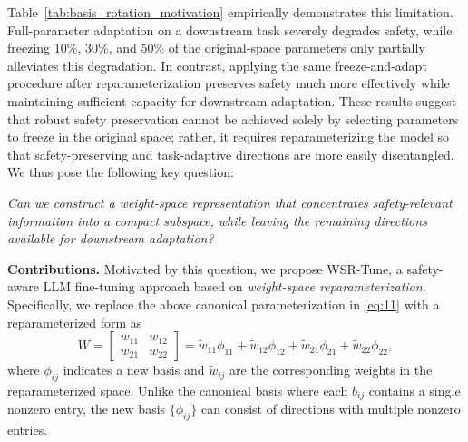 \documentclass{article}
\newcommand{\wjb}[1]{{\leavevmode\color{orange}[jb: #1]}}
\begin{document}
Table~\ref{tab:basis_rotation_motivation} empirically demonstrates this limitation. Full-parameter adaptation on a downstream task severely degrades safety, while freezing 10\%, 30\%, and 50\% of the original-space parameters only partially alleviates this degradation.
In contrast, applying the same freeze-and-adapt procedure after reparameterization preserves safety much more effectively while maintaining sufficient capacity for downstream adaptation. These results suggest that robust safety preservation cannot be achieved solely by selecting parameters to freeze in the original space; rather, it requires reparameterizing the model so that safety-preserving and task-adaptive directions are more easily disentangled.
We thus pose the following key question: 

\textit{Can we construct a weight-space representation that concentrates safety-relevant information into a compact subspace, while leaving the remaining directions available for downstream adaptation?}



\textbf{Contributions.} Motivated by this question, we propose WSR-Tune, a safety-aware LLM fine-tuning approach based on \textit{weight-space reparameterization}.  Specifically, we replace the above canonical parameterization in \eqref{eq:11} with a reparameterized form as
\begin{equation}
W = \begin{bmatrix} w_{11} & w_{12} \\ w_{21} & w_{22} \end{bmatrix} = \tilde{w}_{11} \phi_{11}  + \tilde{w}_{12} \phi_{12} +  \tilde{w}_{21} \phi_{21} + \tilde{w}_{22} \phi_{22},
\end{equation}
where ${\phi_{ij}}$ indicates a new basis and ${\tilde{w}_{ij}}$ are the corresponding weights in the reparameterized space. Unlike the canonical basis where each $b_{ij}$ contains a single nonzero entry, the new basis $\{\phi_{ij}\}$ can consist of directions with multiple nonzero entries.

\end{document}
